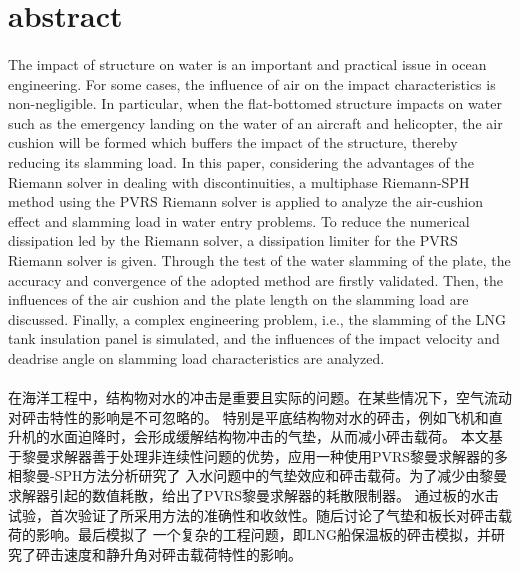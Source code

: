 \documentclass[UTF8]{ctexart}
\begin{document}
\section{abstract}
\paragraph{\quad}The impact of structure on water is an important and practical issue 
                in ocean engineering. For some cases, the influence of air on the impact 
                characteristics is non-negligible. In particular, when the flat-bottomed 
                structure impacts on water such as the emergency landing on the water of 
                an aircraft and helicopter, the air cushion will be formed which buffers 
                the impact of the structure, thereby reducing its slamming load. In this 
                paper, considering the advantages of the Riemann solver in dealing with 
                discontinuities, a multiphase Riemann-SPH method using the PVRS Riemann 
                solver is applied to analyze the air-cushion effect and slamming load in 
                water entry problems. To reduce the numerical dissipation led by the 
                Riemann solver, a dissipation limiter for the PVRS Riemann solver is given.
                Through the test of the water slamming of the plate, the accuracy and convergence 
                of the adopted method are firstly validated. Then, the influences of the air cushion 
                and the plate length on the slamming load are discussed. Finally, a complex 
                engineering problem, i.e., the slamming of the LNG tank insulation panel is 
                simulated, and the influences of the impact velocity and deadrise angle on slamming 
                load characteristics are analyzed.
\paragraph{\quad}在海洋工程中，结构物对水的冲击是重要且实际的问题。在某些情况下，空气流动对砰击特性的影响是不可忽略的。
                特别是平底结构物对水的砰击，例如飞机和直升机的水面迫降时，会形成缓解结构物冲击的气垫，从而减小砰击载荷。
                本文基于黎曼求解器善于处理非连续性问题的优势，应用一种使用PVRS黎曼求解器的多相黎曼-SPH方法分析研究了
                入水问题中的气垫效应和砰击载荷。为了减少由黎曼求解器引起的数值耗散，给出了PVRS黎曼求解器的耗散限制器。
                通过板的水击试验，首次验证了所采用方法的准确性和收敛性。随后讨论了气垫和板长对砰击载荷的影响。最后模拟了
                一个复杂的工程问题，即LNG船保温板的砰击模拟，并研究了砰击速度和静升角对砰击载荷特性的影响。
\end{document}

